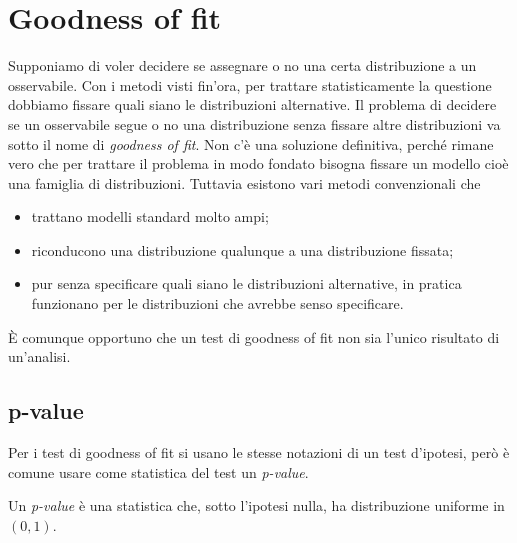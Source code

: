 
\section{Goodness of fit}

Supponiamo di voler decidere se assegnare o no una certa distribuzione a un osservabile.
Con i metodi visti fin'ora,
per trattare statisticamente la questione dobbiamo fissare quali siano le distribuzioni alternative.
Il problema di decidere se un osservabile segue o no una distribuzione
senza fissare altre distribuzioni va sotto il nome di \emph{goodness of fit}.
Non c'è una soluzione definitiva,
perché rimane vero che per trattare il problema in modo fondato
bisogna fissare un modello cioè una famiglia di distribuzioni.
Tuttavia esistono vari metodi convenzionali che
\begin{itemize}
	\item trattano modelli standard molto ampi;
	\item riconducono una distribuzione qualunque a una distribuzione fissata;
	\item pur senza specificare quali siano le distribuzioni alternative,
	in pratica funzionano per le distribuzioni che avrebbe senso specificare.
\end{itemize}
È comunque opportuno che un test di goodness of fit
non sia l'unico risultato di un'analisi.

\subsection{p-value}

Per i test di goodness of fit si usano le stesse notazioni di un test d'ipotesi,
però è comune usare come statistica del test un \emph{p-value}.

\begin{definition}[p-value]
	Un \emph{p-value} è una statistica che,
	sotto l'ipotesi nulla,
	ha distribuzione uniforme in $(0,1)$.
\end{definition}

